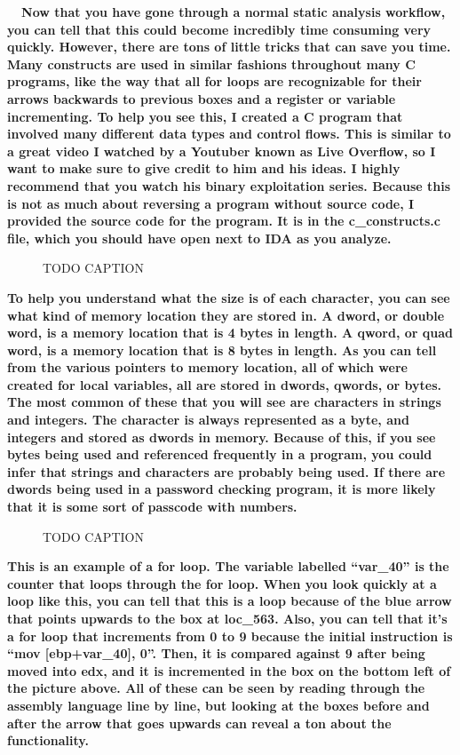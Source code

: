 \documentclass[letterpaper]{article}
\newcommand{\sitfig}[3]{
\begin{figure}[H]
\centering
\makebox[\textwidth][c]{
#2
}
\caption{#3}
\label{#1}
\end{figure}
}
\newcommand{\sitgfx}[4][scale=1.0]{
\sitfig{#3}{\texttt{[image: \#2]}}{#4}
}
\begin{document}
\textbf{ \ \ Now that you have gone through a normal static analysis workflow, you can tell that this could become
incredibly time consuming very quickly. However, there are tons of little tricks that can save you time. Many
constructs are used in similar fashions throughout many C programs, like the way that all for loops are recognizable
for their arrows backwards to previous boxes and a register or variable incrementing. To help you see this, I created a
C program that involved many different data types and control flows. This is similar to a great video I watched by a
Youtuber known as Live Overflow, so I want to make sure to give credit to him and his ideas. I highly recommend that
you watch his binary exploitation series. Because this is not as much about reversing a program without source code, I
provided the source code  for the program. It is in the c\_constructs.c file, which you should have open next to IDA as
you analyze.}

  
\sitgfx[width=3in,height=4.1252in]{FINALWORKINGDOCFORMERLYPRECURSOR-img066.png}{fig:unk}{TODO CAPTION}
 

\textbf{To help you understand what the size is of each character, you can see what kind of memory location they are
stored in. A dword, or double word, is a memory location that is 4 bytes in length. A qword, or quad word, is a memory
location that is 8 bytes in length. As you can tell from the various pointers to memory location, all of which were
created for local variables, all are stored in dwords, qwords, or bytes. The most common of these that you will see are
characters in strings and integers. The character is always represented as a byte, and integers and stored as dwords in
memory. Because of this, if you see bytes being used and referenced frequently in a program, you could infer that
strings and characters are probably being used. If there are dwords being used in a password checking program, it is
more likely that it is some sort of passcode with numbers.}

  
\sitgfx[width=6.4898in,height=3.802in]{FINALWORKINGDOCFORMERLYPRECURSOR-img067.png}{fig:unk}{TODO CAPTION}
 

\textbf{This is an example of a for loop. The variable labelled ``var\_40'' is the counter that loops through the for
loop. When you look quickly at a loop like this, you can tell that this is a loop because of the blue arrow that points
upwards to the box at loc\_563. Also, you can tell that it's a for loop that increments from 0 to 9 because the initial
instruction is ``mov [ebp+var\_40], 0''. Then, it is compared against 9 after being moved into edx, and it is
incremented in the box on the bottom left of the picture above. All of these can be seen by reading through the
assembly language line by line, but looking at the boxes before and after the arrow that goes upwards can reveal a ton
about the functionality.}
\end{document}
